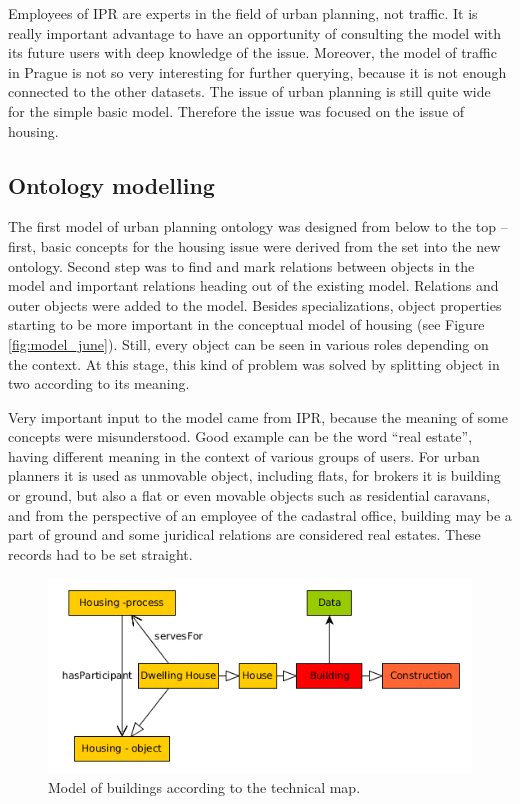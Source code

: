\documentclass{lncs-template/llncs}
\begin{document}
Employees of IPR are experts in the field of urban planning, not traffic. It is really important advantage to have an opportunity of consulting the model with its future users with deep knowledge of the issue. Moreover, the model of traffic in Prague is not so very interesting for further querying, because it is not enough connected to the other datasets. The issue of urban planning is still quite wide for the simple basic model. Therefore the issue was focused on the issue of housing.

\subsection{Ontology modelling}\label{sec:modelling}

The first model of urban planning ontology was designed from below to the top -- first, basic concepts for the housing issue were derived from the set into the new ontology. Second step was to find and mark relations between objects in the model and important relations heading out of the existing model. Relations and outer objects were added to the model. Besides specializations, object properties starting to be more important in the conceptual model of housing (see Figure \ref{fig:model_june}). Still, every object can be seen in various roles depending on the context. At this stage, this kind of problem was solved by splitting object in two according to its meaning.

Very important input to the model came from IPR, because the meaning of some concepts were misunderstood. Good example can be the word ``real estate'', having different meaning in the context of various groups of users. For urban planners it is used as unmovable object, including flats, for brokers it is building or ground, but also a flat or even movable objects such as residential caravans, and from the perspective of an employee of the cadastral office, building may be a part of ground and some juridical relations are considered real estates. These records had to be set straight.


\begin{figure}
 \includegraphics[width=1.0\textwidth]{images/BUILDINGS.png}
 \caption{Model of buildings according to the technical map.}\label{fig:dat_buil}
\end{figure}
\end{document}
